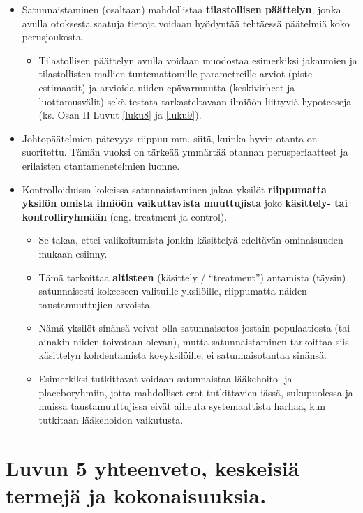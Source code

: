 \documentclass[
]{book}
\providecommand{\tightlist}{%
  \setlength{\itemsep}{0pt}\setlength{\parskip}{0pt}}
\begin{document}
\begin{itemize}
\item
  Satunnaistaminen (osaltaan) mahdollistaa \textbf{tilastollisen päättelyn}, jonka avulla otoksesta saatuja tietoja voidaan hyödyntää tehtäessä päätelmiä koko perusjoukosta.

  \begin{itemize}
  \tightlist
  \item
    Tilastollisen päättelyn avulla voidaan muodostaa esimerkiksi jakaumien ja tilastollisten mallien tuntemattomille parametreille arviot (piste-estimaatit) ja arvioida niiden epävarmuutta (keskivirheet ja luottamusvälit) sekä testata tarkasteltavaan ilmiöön liittyviä hypoteeseja (ks. Osan II Luvut \ref{luku8} ja \ref{luku9}).
  \end{itemize}
\item
  Johtopäätelmien pätevyys riippuu mm. siitä, kuinka hyvin otanta on suoritettu. Tämän vuoksi on tärkeää ymmärtää otannan perusperiaatteet ja erilaisten otantamenetelmien luonne.
\item
  Kontrolloiduissa kokeissa satunnaistaminen jakaa yksilöt \textbf{riippumatta yksilön omista ilmiöön vaikuttavista muuttujista} joko \textbf{käsittely- tai kontrolliryhmään} (eng. treatment ja control).

  \begin{itemize}
  \tightlist
  \item
    Se takaa, ettei valikoitumista jonkin käsittelyä edeltävän ominaisuuden mukaan esiinny.
  \item
    Tämä tarkoittaa \textbf{altisteen} (käsittely / ``treatment'') antamista (täysin) satunnaisesti kokeeseen valituille yksilöille, riippumatta näiden taustamuuttujien arvoista.
  \item
    Nämä yksilöt sinänsä voivat olla satunnaisotos jostain populaatiosta (tai ainakin niiden toivotaan olevan), mutta satunnaistaminen tarkoittaa siis käsittelyn kohdentamista koeyksilöille, ei satunnaisotantaa sinänsä.
  \item
    Esimerkiksi tutkittavat voidaan satunnaistaa lääkehoito- ja placeboryhmiin, jotta mahdolliset erot tutkittavien iässä, sukupuolessa ja muissa taustamuuttujissa eivät aiheuta systemaattista harhaa, kun tutkitaan lääkehoidon vaikutusta.
  \end{itemize}
\end{itemize}

\hypertarget{luvun-5-yhteenveto-keskeisiuxe4-termejuxe4-ja-kokonaisuuksia.}{%
\section{Luvun 5 yhteenveto, keskeisiä termejä ja kokonaisuuksia.}\label{luvun-5-yhteenveto-keskeisiuxe4-termejuxe4-ja-kokonaisuuksia.}}
\end{document}
